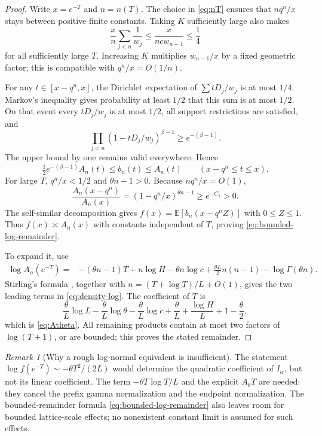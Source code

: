 \documentclass[11pt,a4paper]{article}
\numberwithin{equation}{section}
\theoremstyle{definition}\newaliascnt{definition}{theorem}
\theoremstyle{remark}\newaliascnt{remark}{theorem}
\newtheorem{remark}[remark]{Remark}
\newcommand{\E}{\mathbb E}\newcommand{\Prb}{\mathbb P}
\newcommand{\asympc}{\asymp}
\begin{document}
\begin{proof}
Write $x=e^{-T}$ and $n=n(T)$. The choice in \eqref{eq:nT} ensures that
$nq^n/x$ stays between positive finite constants. Taking $K$ sufficiently
large also makes
\begin{equation}
 \frac{x}{n}\sum_{j<n}\frac1{w_j}
 \le\frac{x}{ncw_{n-1}}\le\frac14
 \label{eq:Dirichlet-small}
\end{equation}
for all sufficiently large $T$. Increasing $K$ multiplies $w_{n-1}/x$
by a fixed geometric factor; this is compatible with $q^n/x=O(1/n)$.

For any $t\in[x-q^n,x]$, the Dirichlet expectation of
$\sum tD_j/w_j$ is at most $1/4$. Markov's inequality gives probability
at least $1/2$ that this sum is at most $1/2$. On that event every
$tD_j/w_j$ is at most $1/2$, all support restrictions are satisfied, and
\[
 \prod_{j<n}(1-tD_j/w_j)^{\beta-1}\ge e^{-(\beta-1)}.
\]
The upper bound by one remains valid everywhere. Hence
\begin{equation}
 \tfrac12 e^{-(\beta-1)}A_n(t)\le b_n(t)\le A_n(t)
 \qquad (x-q^n\le t\le x).
 \label{eq:head-density-comparison}
\end{equation}
For large $T$, $q^n/x<1/2$ and $\theta n-1>0$. Because
$nq^n/x=O(1)$,
\[
 \frac{A_n(x-q^n)}{A_n(x)}
  =(1-q^n/x)^{\theta n-1}\ge e^{-C_1}>0.
\]
The self-similar decomposition gives
$f(x)=\E[b_n(x-q^nZ)]$ with $0\le Z\le1$. Thus
$f(x)\asympc A_n(x)$ with constants independent of $T$, proving
\eqref{eq:bounded-log-remainder}.

To expand it, use
\begin{align}
 \log A_n(e^{-T})={}&-(\theta n-1)T+n\log H-\theta n\log c
       +\frac{\theta L}{2}n(n-1)-\log\Gamma(\theta n).
 \label{eq:An-log}
\end{align}
Stirling's formula \cite{dlmf-gamma}, together with
$n=(T+\log T)/L+O(1)$, gives the two leading terms in
\eqref{eq:density-log}. The coefficient of $T$ is
\[
 \frac{\theta}{L}\log L-\frac{\theta}{L}\log\theta
 -\frac{\theta}{L}\log c+\frac{\theta}{L}
 +\frac{\log H}{L}+1-\frac{\theta}{2},
\]
which is \eqref{eq:Atheta}. All remaining products contain at most two
factors of $\log(T+1)$, or are bounded; this proves the stated remainder.
\end{proof}

\begin{remark}[Why a rough log-normal equivalent is insufficient]
The statement $\log f(e^{-T})\sim-\theta T^2/(2L)$ would determine the
quadratic coefficient of $I_\alpha$, but not its linear coefficient.
The term $-\theta T\log T/L$ and the explicit $A_\theta T$ are needed:
they cancel the prefix gamma normalization and the endpoint normalization.
The bounded-remainder formula \eqref{eq:bounded-log-remainder} also leaves
room for bounded lattice-scale effects; no nonexistent constant limit is
assumed for such effects.
\end{remark}
\end{document}
